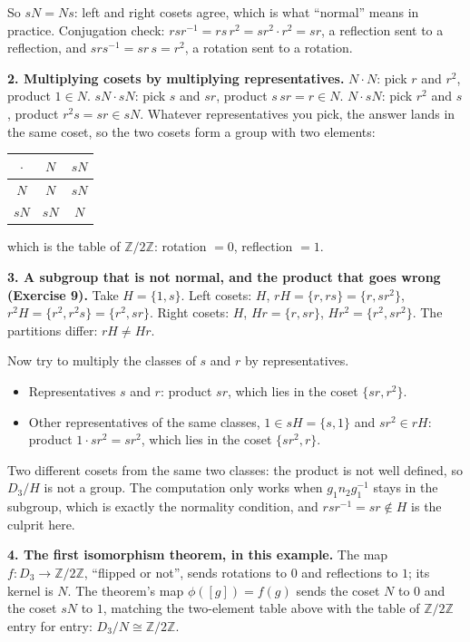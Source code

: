 \documentclass[10pt]{article}
\newcommand{\Z}{\mathbb{Z}}
\begin{document}
{\begin{minipage}[t]{744pt}
\begin{minipage}[t]{360pt}
So $sN=Ns$: left and right cosets agree, which is what ``normal'' means in practice. Conjugation check: $rsr^{-1}=rs\,r^2=sr^2\cdot r^2=sr$, a reflection sent to a reflection, and $srs^{-1}=sr\,s=r^2$, a rotation sent to a rotation.
\par\vspace{4pt}
{\sffamily\bfseries 2. Multiplying cosets by multiplying representatives.} $N\cdot N$: pick $r$ and $r^2$, product $1\in N$. $sN\cdot sN$: pick $s$ and $sr$, product $s\,sr=r\in N$. $N\cdot sN$: pick $r^2$ and $s$, product $r^2s=sr\in sN$. Whatever representatives you pick, the answer lands in the same coset, so the two cosets form a group with two elements:
\begin{center}\small
\begin{tabular}{c|cc}
$\cdot$ & $N$ & $sN$\\ \hline
$N$ & $N$ & $sN$\\
$sN$ & $sN$ & $N$
\end{tabular}\qquad which is the table of $\Z/2\Z$: rotation $=0$, reflection $=1$.
\end{center}
\end{minipage}\hfill
\begin{minipage}[t]{360pt}\vspace{0pt}
{\sffamily\bfseries 3. A subgroup that is not normal, and the product that goes wrong (Exercise 9).} Take $H=\{1,s\}$. Left cosets: $H$, $rH=\{r,rs\}=\{r,sr^2\}$, $r^2H=\{r^2,r^2s\}=\{r^2,sr\}$. Right cosets: $H$, $Hr=\{r,sr\}$, $Hr^2=\{r^2,sr^2\}$. The partitions differ: $rH\neq Hr$.
\par\vspace{3pt}
Now try to multiply the classes of $s$ and $r$ by representatives.
\begin{itemize}[nosep,leftmargin=*]
\item Representatives $s$ and $r$: product $sr$, which lies in the coset $\{sr,r^2\}$.
\item Other representatives of the same classes, $1\in sH=\{s,1\}$ and $sr^2\in rH$: product $1\cdot sr^2=sr^2$, which lies in the coset $\{sr^2,r\}$.
\end{itemize}
Two different cosets from the same two classes: the product is not well defined, so $D_3/H$ is not a group. The computation only works when $g_1n_2g_1^{-1}$ stays in the subgroup, which is exactly the normality condition, and $rsr^{-1}=sr\notin H$ is the culprit here.
\par\vspace{4pt}
{\sffamily\bfseries 4. The first isomorphism theorem, in this example.} The map $f:D_3\to\Z/2\Z$, ``flipped or not'', sends rotations to $0$ and reflections to $1$; its kernel is $N$. The theorem's map $\phi([g])=f(g)$ sends the coset $N$ to $0$ and the coset $sN$ to $1$, matching the two-element table above with the table of $\Z/2\Z$ entry for entry: $D_3/N\cong\Z/2\Z$.

\end{minipage}
\end{minipage}}
\end{document}
